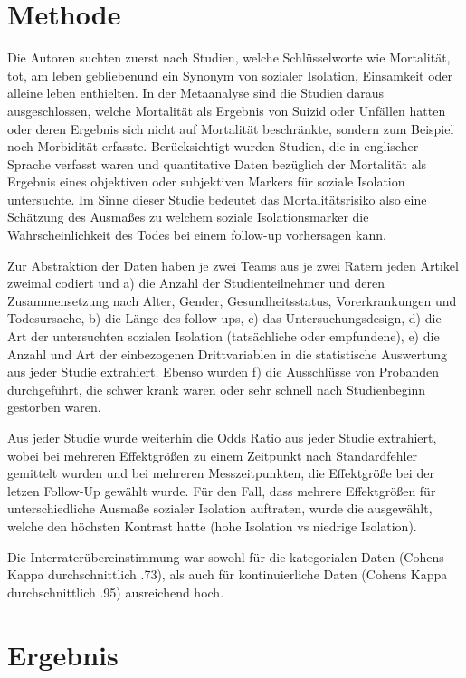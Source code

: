 \documentclass[doc]{apa6}
\begin{document}
            

        
    \section{Methode}
        Die Autoren suchten zuerst nach Studien, welche Schlüsselworte wie \glqq Mortalität\grqq, \glqq tot\grqq, \glqq am leben geblieben\grqq und ein Synonym von sozialer Isolation, Einsamkeit oder alleine leben enthielten. In der Metaanalyse sind die Studien daraus ausgeschlossen, welche Mortalität als Ergebnis von Suizid oder Unfällen hatten oder deren Ergebnis sich nicht auf Mortalität beschränkte, sondern zum Beispiel noch Morbidität erfasste. Berücksichtigt wurden Studien, die in englischer Sprache verfasst waren und quantitative Daten bezüglich der Mortalität als Ergebnis eines objektiven oder subjektiven Markers für soziale Isolation untersuchte. Im Sinne dieser Studie bedeutet das Mortalitätsrisiko also eine Schätzung des Ausmaßes zu welchem soziale Isolationsmarker die Wahrscheinlichkeit des Todes bei einem follow-up vorhersagen kann.
        
        Zur Abstraktion der Daten haben je zwei Teams aus je zwei Ratern jeden Artikel zweimal codiert und a) die Anzahl der Studienteilnehmer und deren Zusammensetzung nach Alter, Gender, Gesundheitsstatus, Vorerkrankungen und Todesursache, b) die Länge des follow-ups, c) das Untersuchungsdesign, d) die Art der untersuchten sozialen Isolation (tatsächliche oder empfundene), e) die Anzahl und Art der einbezogenen Drittvariablen in die statistische Auswertung aus jeder Studie extrahiert. Ebenso wurden f) die Ausschlüsse von Probanden durchgeführt, die schwer krank waren oder sehr schnell nach Studienbeginn gestorben waren. 
        
        Aus jeder Studie wurde weiterhin die Odds Ratio aus jeder Studie extrahiert, wobei bei mehreren Effektgrößen zu einem Zeitpunkt nach Standardfehler gemittelt wurden und bei mehreren Messzeitpunkten, die Effektgröße bei der letzen Follow-Up gewählt wurde. Für den Fall, dass mehrere Effektgrößen für unterschiedliche Ausmaße sozialer Isolation auftraten, wurde die ausgewählt, welche den höchsten Kontrast hatte (hohe Isolation vs niedrige Isolation).
        
        Die Interraterübereinstimmung war sowohl für die  kategorialen Daten (Cohens Kappa durchschnittlich .73), als auch für kontinuierliche Daten (Cohens Kappa durchschnittlich .95) ausreichend hoch.
        
    \section{Ergebnis}
        
\end{document}
